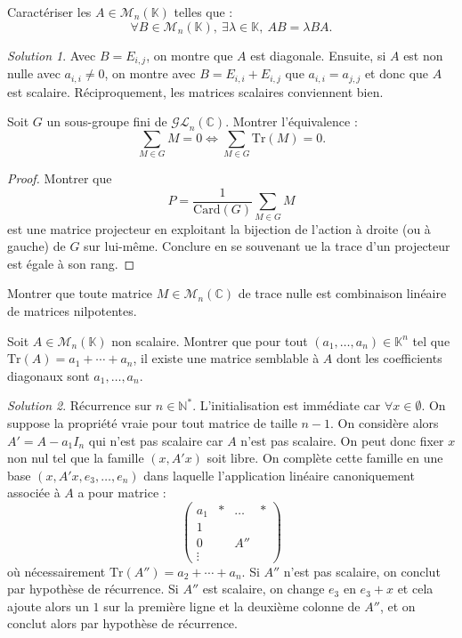 \documentclass[french]{book}
\newcommand{\N}{\mathbb{N}}
\newcommand{\C}{\mathbb{C}}
\newcommand{\K}{\mathbb{K}}
\newcommand{\st}{^*}
\newcommand{\card}{\text{Card}}
\newcommand{\Tr}{\text{Tr}}
\theoremstyle{definition}
\theoremstyle{remark}
\newtheorem*{sol}{Solution}
\begin{document}
\begin{exo}[1]{}
	Caractériser les $A\in\mathcal{M}_n(\K)$ telles que :
	$$\forall B\in\mathcal{M}_n(\K),\ \exists\lambda\in\K,\ AB=\lambda BA.$$
\end{exo}
\begin{sol}
	Avec $B=E_{i,j}$, on montre que $A$ est diagonale. Ensuite, si $A$ est non nulle avec $a_{i,i}\ne 0$, on montre avec $B=E_{i,i}+E_{i,j}$ que $a_{i,i}=a_{j,j}$ et donc que $A$ est scalaire. Réciproquement, les matrices scalaires conviennent bien.
\end{sol}

\begin{exo}[1]{}
	Soit $G$ un sous-groupe fini de $\mathcal{GL}_n(\C)$. Montrer l'équivalence :
	$$\sum_{M\in G}M=0\iff\sum_{M\in G}\Tr(M)=0.$$
\end{exo}
\begin{proof}
	Montrer que $$P=\frac{1}{\card(G)}\sum_{M\in G}M$$ est une matrice projecteur en exploitant la bijection de l'action à droite (ou à gauche) de $G$ sur lui-même. Conclure en se souvenant ue la trace d'un projecteur est égale à son rang.
\end{proof}

\begin{exo}[1]{}
	Montrer que toute matrice $M\in\mathcal{M}_n(\C)$ de trace nulle est combinaison linéaire de matrices nilpotentes.
\end{exo}


\begin{exo}[2]{}
	Soit $A\in\mathcal{M}_n(\K)$ non scalaire. Montrer que pour tout $(a_1,\ldots,a_n)\in\K^n$ tel que $\Tr(A)=a_1+\cdots+a_n$, il existe une matrice semblable à $A$ dont les coefficients diagonaux sont $a_1,\ldots,a_n$.
\end{exo}
\begin{sol}
	Récurrence sur $n\in\N\st$. L'initialisation est immédiate car $\forall x\in\emptyset$. On suppose la propriété vraie pour tout matrice de taille $n-1$. On considère alors $A'=A-a_1I_n$ qui n'est pas scalaire car $A$ n'est pas scalaire. On peut donc fixer $x$ non nul tel que la famille $(x,A'x)$ soit libre. On complète cette famille en une base $(x,A'x,e_3,\ldots,e_n)$ dans laquelle l'application linéaire canoniquement associée à $A$ a pour matrice : $$\begin{pmatrix}
		a_1&*&\ldots&*\\
		1&&&\\
		0&&A''&\\
		\vdots&&&
	\end{pmatrix}$$ où nécessairement $\Tr(A'')=a_2+\cdots+a_n$. Si $A''$ n'est pas scalaire, on conclut par hypothèse de récurrence. Si $A''$ est scalaire, on change $e_3$ en $e_3+x$ et cela ajoute alors un $1$ sur la première ligne et la deuxième colonne de $A''$, et on conclut alors par hypothèse de récurrence.
\end{sol}
\end{document}
